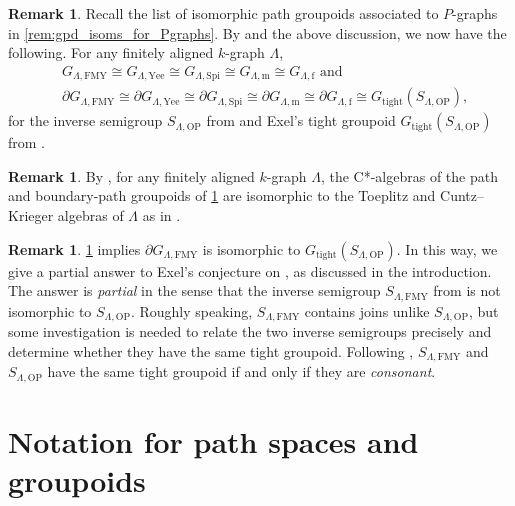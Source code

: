 \documentclass[11pt]{amsart}
\theoremstyle{definition}
\numberwithin{thm}{section}
\numberwithin{equation}{section}
\newtheorem{remark}[thm]{Remark}
\newcommand{\emphasis}[1]{\textit{#1}}
\newcommand{\ofFMY}{\mathrm{FMY}}
\newcommand{\ofYeend}{\mathrm{Yee}}
\newcommand{\ofSpielberg}{\mathrm{Spi}}
\newcommand{\ofOP}{\mathrm{OP}}
\newcommand{\M}{\mathrm{m}}
\newcommand{\F}{\mathrm{f}}
\newcommand{\PG}[2]{{G_{#2, #1}}}
\newcommand{\BPG}[2]{\partial\PG{#1}{#2}}
\newcommand{\tightgpd}{G_\mathrm{tight}}
\begin{document}
\begin{remark}
\label{rem:gpd_isoms_for_kgraphs}
Recall the list of isomorphic path groupoids associated to $P$-graphs in \cref{rem:gpd_isoms_for_Pgraphs}.
By \cite[Examples 4.10(ii)]{Yee07} and the above discussion, we now have the following.
For any finitely aligned $k$-graph $\Lambda$,
\begin{align*}
&\PG{\ofFMY}{\Lambda}
\cong \PG{\ofYeend}{\Lambda}
\cong \PG{\ofSpielberg}{\Lambda} 
\cong \PG{\M}{\Lambda} 
\cong \PG{\F}{\Lambda} \text{ and } \\
&\BPG{\ofFMY}{\Lambda}
\cong \BPG{\ofYeend}{\Lambda}
\cong \BPG{\ofSpielberg}{\Lambda}
\cong \BPG{\M}{\Lambda}
\cong \BPG{\F}{\Lambda} 
\cong \tightgpd(S_{\Lambda, \ofOP}),
\end{align*}
for the inverse semigroup $S_{\Lambda, \ofOP}$ from \cite[Definition 2.2]{OP20} and Exel's tight groupoid $\tightgpd(S_{\Lambda, \ofOP})$ from \cite[Theorem 13.3]{Exe08}.
\end{remark}

\begin{remark}
By \cite[Remark 5.9]{FMY05}, for any finitely aligned $k$-graph $\Lambda$, the C*-algebras of the path and boundary-path groupoids of \cref{rem:gpd_isoms_for_kgraphs} are isomorphic to the Toeplitz and Cuntz--Krieger algebras of $\Lambda$ as in \cite[Remark 3.9]{FMY05}.
\end{remark}

\begin{remark}
\label{rem:Exel}
\cref{rem:gpd_isoms_for_kgraphs} implies $\BPG{\ofFMY}{\Lambda}$ is isomorphic to $\tightgpd(S_{\Lambda, \ofOP})$. 
In this way, we give a partial answer to Exel's conjecture on \cite[Page 195]{Exe08}, as discussed in the introduction. 
The answer is \emphasis{partial} in the sense that the inverse semigroup $S_{\Lambda, \ofFMY}$ from \cite[Definition 4.1]{FMY05} is not isomorphic to $S_{\Lambda, \ofOP}$. 
Roughly speaking, $S_{\Lambda, \ofFMY}$ contains joins unlike $S_{\Lambda, \ofOP}$, but some investigation is needed to relate the two inverse semigroups precisely and determine whether they have the same tight groupoid. 
Following \cite{arXiv_Exe25}, $S_{\Lambda, \ofFMY}$ and $S_{\Lambda, \ofOP}$ have the same tight groupoid if and only if they are \emphasis{consonant}.
\end{remark}

\appendix 
\section{Notation for path spaces and groupoids}
\label{sec:notation}
\end{document}
